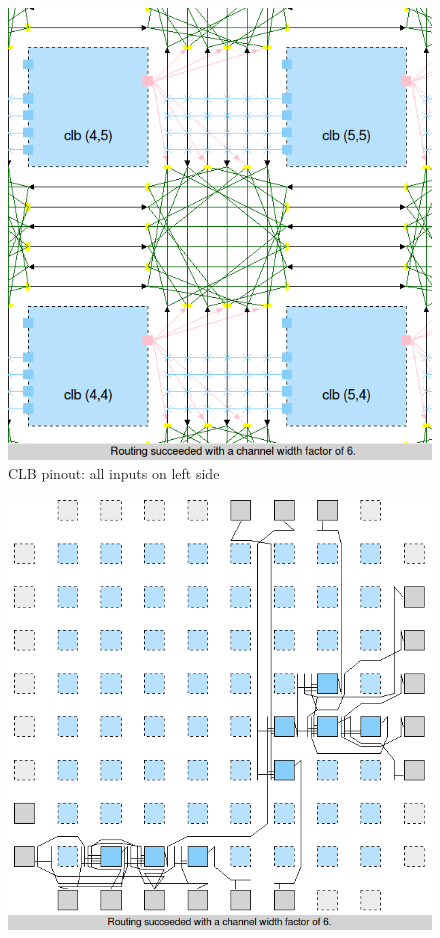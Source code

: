 \begin{itemize}
\begin{figure}[H]
\centering
\includegraphics[scale=0.4]{BTP_work/5-bit_adder_on_left_only_clb/clb_pinout.png}
\caption{CLB pinout: all inputs on left side}
\label{fig:Figure}
\end{figure}
\begin{figure}[H]
\centering
\includegraphics[scale=0.3]{BTP_work/5-bit_adder_on_left_only_clb/routing.png}

\end{figure}
\end{itemize}
